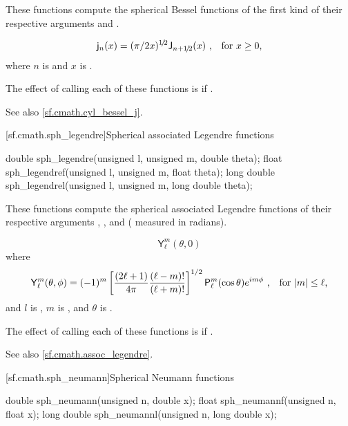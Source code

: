 \begin{itemdescr}
\pnum
\effects
These functions compute
the spherical Bessel functions of the first kind
of their respective arguments
 and .

\pnum
\returns
\[ \mathsf{j}_n(x) = (\pi/2x)^{1\!/\!2} \mathsf{J}_{n + 1\!/\!2}(x) \text{ ,\quad for $x \ge 0$,} \]
where
$n$ is  and
$x$ is .

\pnum\remarks
The effect of calling each of these functions
is 
if .

\pnum See also \ref{sf.cmath.cyl_bessel_j}.
\end{itemdescr}

[sf.cmath.sph_legendre]{Spherical associated Legendre functions}%
%
%
%
%
%
%
\begin{itemdecl}
double       sph_legendre(unsigned l, unsigned m, double theta);
float        sph_legendref(unsigned l, unsigned m, float theta);
long double  sph_legendrel(unsigned l, unsigned m, long double theta);
\end{itemdecl}

\begin{itemdescr}
\pnum
\effects
These functions compute the spherical associated Legendre functions
of their respective arguments
, , and  ( measured in radians).

\pnum
\returns
\[ \mathsf{Y}_\ell^m(\theta, 0) \]
where
\[ \mathsf{Y}_\ell^m(\theta, \phi) =
     (-1)^m \left[\frac{(2 \ell + 1)}{4 \pi} \frac{(\ell - m)!}{(\ell + m)!}\right]^{1/2}
     \mathsf{P}_\ell^m (\cos\theta) e^{i m \phi}
     \text{ ,\quad for $|m| \le \ell$,}
\]
and
$l$ is ,
$m$ is , and
$\theta$ is .

\pnum
\remarks
The effect of calling each of these functions
is 
if .

\pnum
See also \ref{sf.cmath.assoc_legendre}.
\end{itemdescr}

[sf.cmath.sph_neumann]{Spherical Neumann functions}%
%
%
%
%
%
%
\begin{itemdecl}
double       sph_neumann(unsigned n, double x);
float        sph_neumannf(unsigned n, float x);
long double  sph_neumannl(unsigned n, long double x);
\end{itemdecl}

